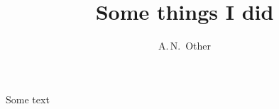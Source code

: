 \documentclass[titlepage]{article}
\author{A.\,N.~Other}
\title{Some things I did}
\begin{document}
\maketitle
Some text
\end{document}
